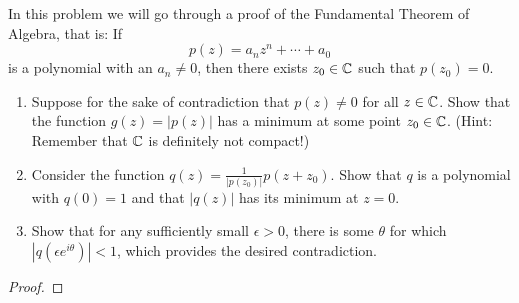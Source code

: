 \documentclass[../hw1]{subfiles}
\begin{document}
\begin{problem}
In this problem we will go through a proof of the Fundamental Theorem of Algebra,
that is: If \[
	p(z)=a_n z^n + \cdots + a_0
\] is a polynomial with an $a_n\neq 0$, then there exists $z_0\in \mathbb{C}$ such that $p(z_0)=0$.
\begin{enumerate}[label=(\roman*)]
	\item Suppose for the sake of contradiction that $p(z) \neq 0$ for all $z \in \mathbb{C}$. Show that the function $g(z) = |p(z)|$ has a minimum at some point $z_0\in \mathbb{C}$. (Hint: Remember that $\mathbb{C}$ is definitely not compact!)
	\item Consider the function $q(z)=\frac{1}{|p(z_0)|}p(z+z_0)$.
	      Show that $q$ is a polynomial with $q(0) = 1$ and that $|q(z)|$ has its minimum at $z = 0$.
	\item Show that for any sufficiently small $\epsilon>0$, there is some $\theta$ for which $|q(\epsilon e^{i\theta})|<1$, which provides the desired contradiction.
\end{enumerate}
\end{problem}
\begin{proof}

\end{proof}
\end{document}
